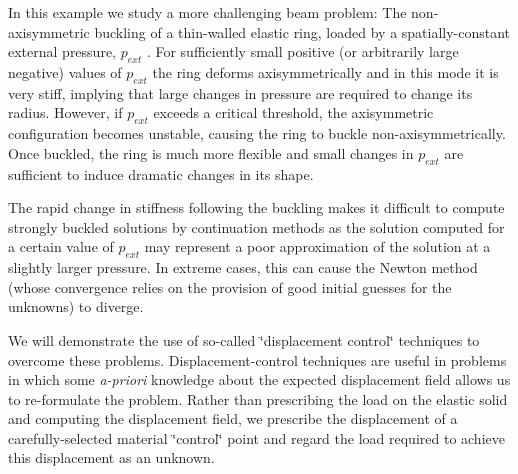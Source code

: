 In this example we study a more challenging beam problem\+: The non-\/axisymmetric buckling of a thin-\/walled elastic ring, loaded by a spatially-\/constant external pressure, $ p_{ext}$ . For sufficiently small positive (or arbitrarily large negative) values of $ p_{ext}$ the ring deforms axisymmetrically and in this mode it is very stiff, implying that large changes in pressure are required to change its radius. However, if $ p_{ext}$ exceeds a critical threshold, the axisymmetric configuration becomes unstable, causing the ring to buckle non-\/axisymmetrically. Once buckled, the ring is much more flexible and small changes in $ p_{ext}$ are sufficient to induce dramatic changes in its shape.

The rapid change in stiffness following the buckling makes it difficult to compute strongly buckled solutions by continuation methods as the solution computed for a certain value of $ p_{ext}$ may represent a poor approximation of the solution at a slightly larger pressure. In extreme cases, this can cause the Newton method (whose convergence relies on the provision of good initial guesses for the unknowns) to diverge.

We will demonstrate the use of so-\/called \char`\"{}displacement control\char`\"{} techniques to overcome these problems. Displacement-\/control techniques are useful in problems in which some {\itshape a-\/priori} knowledge about the expected displacement field allows us to re-\/formulate the problem. Rather than prescribing the load on the elastic solid and computing the displacement field, we prescribe the displacement of a carefully-\/selected material \char`\"{}control\char`\"{} point and regard the load required to achieve this displacement as an unknown.

